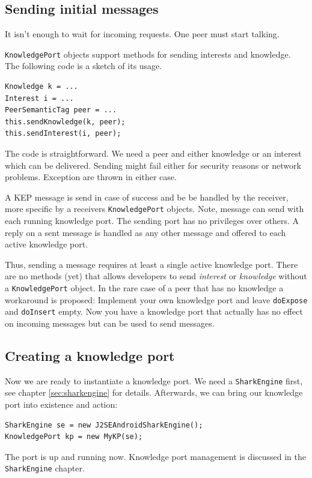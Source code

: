 \subsection{Sending initial messages}
It isn't enough to wait for incoming requests. One peer must start talking.

{\tt KnowledgePort} objects support methods for sending interests and knowledge. The following code is a sketch of its usage.

\begin{verbatim}
Knowledge k = ...
Interest i = ...
PeerSemanticTag peer = ...
this.sendKnowledge(k, peer);
this.sendInterest(i, peer);
\end{verbatim}

The code is straightforward. We need a peer and either knowledge or an interest which can be delivered. Sending might fail either for security reasons or network problems. Exception are thrown in either case.

A KEP message is send in case of success and be be handled by the receiver, more specific by a receivers {\tt KnowledgePort} objects. Note, message can send with each running knowledge port. The sending port has no privileges over others. A reply on a sent message is handled as any other message and offered to each active knowledge port.

Thus, sending a message requires at least a single active knowledge port. 
There are no methods (yet) that allows developers to send {\it interest} or {\it knowledge} without a {\tt KnowledgePort} object. In the rare case of a peer that has no knowledge a workaround is proposed: Implement your own knowledge port and leave {\tt doExpose} and {\tt doInsert} empty. Now you have a knowledge port that actually has no effect on incoming messages but can be used to send messages.

\subsection{Creating a knowledge port}
Now we are ready to instantiate a knowledge port. We need a {\tt SharkEngine} first, see chapter \ref{sec:sharkengine} for details. Afterwards, we can bring our knowledge port into existence and action:

\begin{verbatim}
SharkEngine se = new J2SEAndroidSharkEngine();
KnowledgePort kp = new MyKP(se);
\end{verbatim}

The port is up and running now. Knowledge port management is discussed in the {\tt SharkEngine} chapter.

